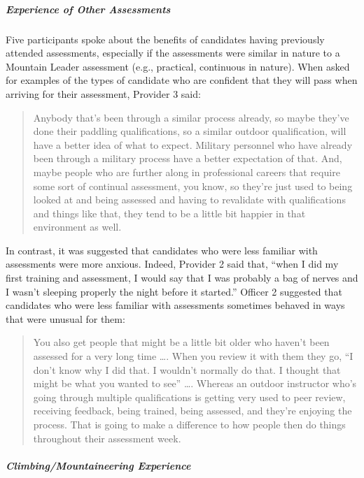 \documentclass[
  12pt,
  a4paper,
]{book}
\begin{document}
\hypertarget{experience-of-other-assessments}{%
\subparagraph{Experience of Other Assessments}\label{experience-of-other-assessments}}

Five participants spoke about the benefits of candidates having previously attended assessments, especially if the assessments were similar in nature to a Mountain Leader assessment (e.g., practical, continuous in nature). When asked for examples of the types of candidate who are confident that they will pass when arriving for their assessment, Provider 3 said:

\begin{quote}
Anybody that's been through a similar process already, so maybe they've done their paddling qualifications, so a similar outdoor qualification, will have a better idea of what to expect. Military personnel who have already been through a military process have a better expectation of that. And, maybe people who are further along in professional careers that require some sort of continual assessment, you know, so they're just used to being looked at and being assessed and having to revalidate with qualifications and things like that, they tend to be a little bit happier in that environment as well.
\end{quote}

In contrast, it was suggested that candidates who were less familiar with assessments were more anxious. Indeed, Provider 2 said that, ``when I did my first training and assessment, I would say that I was probably a bag of nerves and I wasn't sleeping properly the night before it started.'' Officer 2 suggested that candidates who were less familiar with assessments sometimes behaved in ways that were unusual for them:

\begin{quote}
You also get people that might be a little bit older who haven't been assessed for a very long time \ldots. When you review it with them they go, ``I don't know why I did that. I wouldn't normally do that. I thought that might be what you wanted to see'' \ldots. Whereas an outdoor instructor who's going through multiple qualifications is getting very used to peer review, receiving feedback, being trained, being assessed, and they're enjoying the process. That is going to make a difference to how people then do things throughout their assessment week.
\end{quote}

\hypertarget{climbingmountaineering-experience}{%
\subparagraph{Climbing/Mountaineering Experience}\label{climbingmountaineering-experience}}
\end{document}

